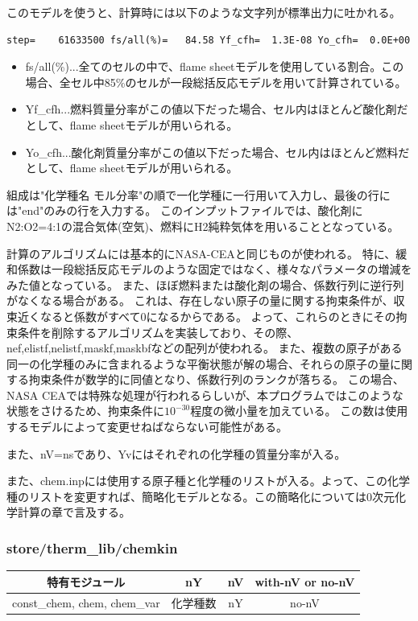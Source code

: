 \documentclass{jsarticle}
\begin{document}
このモデルを使うと、計算時には以下のような文字列が標準出力に吐かれる。
\begin{verbatim}
step=    61633500 fs/all(%)=   84.58 Yf_cfh=  1.3E-08 Yo_cfh=  0.0E+00
\end{verbatim}
\begin{itemize}
\item fs/all(\%)...全てのセルの中で、flame sheetモデルを使用している割合。この場合、全セル中85\%のセルが一段総括反応モデルを用いて計算されている。
\item Yf\_cfh...燃料質量分率がこの値以下だった場合、セル内はほとんど酸化剤だとして、flame sheetモデルが用いられる。
\item Yo\_cfh...酸化剤質量分率がこの値以下だった場合、セル内はほとんど燃料だとして、flame sheetモデルが用いられる。
\end{itemize}

組成は"化学種名 モル分率"の順で一化学種に一行用いて入力し、最後の行には"end"のみの行を入力する。
このインプットファイルでは、酸化剤にN2:O2=4:1の混合気体(空気)、燃料にH2純粋気体を用いることとなっている。

計算のアルゴリズムには基本的にNASA-CEAと同じものが使われる。
特に、緩和係数は一段総括反応モデルのような固定ではなく、様々なパラメータの増減をみた値となっている。
また、ほぼ燃料または酸化剤の場合、係数行列に逆行列がなくなる場合がある。
これは、存在しない原子の量に関する拘束条件が、収束近くなると係数がすべて0になるからである。
よって、これらのときにその拘束条件を削除するアルゴリズムを実装しており、その際、nef,elistf,nelistf,maskf,maskbfなどの配列が使われる。
また、複数の原子がある同一の化学種のみに含まれるような平衡状態が解の場合、それらの原子の量に関する拘束条件が数学的に同値となり、係数行列のランクが落ちる。
この場合、NASA CEAでは特殊な処理が行われるらしいが、本プログラムではこのような状態をさけるため、拘束条件に$10^{-30}$程度の微小量を加えている。
この数は使用するモデルによって変更せねばならない可能性がある。

また、nV=nsであり、Yvにはそれぞれの化学種の質量分率が入る。

また、chem.inpには使用する原子種と化学種のリストが入る。よって、この化学種のリストを変更すれば、簡略化モデルとなる。この簡略化については0次元化学計算の章で言及する。
\subsubsection{store/therm\_lib/chemkin}%
\begin{center}
\begin{tabular}{cccc}\hline
特有モジュール               &       nY & nV & with-nV or no-nV\\\hline \hline
const\_chem, chem, chem\_var & 化学種数 & nY & no-nV\\
\hline
\end{tabular}
\end{center}
\end{document}
